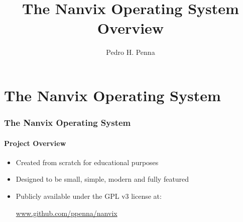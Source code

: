 \documentclass{beamer}
\title[Nanvix]{%
	\textbf{%
		The Nanvix Operating System\\
		\small{Overview}
	}
}
\author[Pedro H. Penna]{%
	Pedro H. Penna%
}
\institute{
	\url{pedrohenriquepenna@gmail.com}
}
\begin{document}
\frame{\titlepage}

\section{The Nanvix Operating System}

		\begin{frame}
		\frametitle{The Nanvix Operating System}
		\framesubtitle{Project Overview}
			\begin{itemize}
			\setlength\itemsep{0.5em}
				\item Created from scratch for educational purposes
				
				\item Designed to be small, simple, modern and fully featured
				
				\item Publicly available under the GPL v3 license at:
					\\[1em]
					\begin{center}
						\url{www.github.com/ppenna/nanvix}
					\end{center}
			\end{itemize}


\end{frame}
\end{document}
